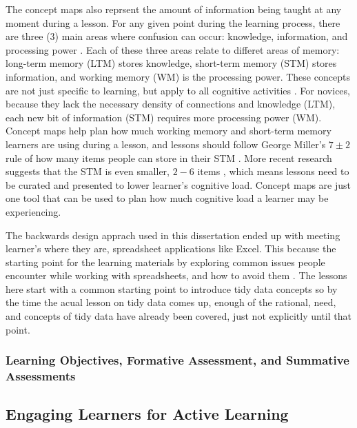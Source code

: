 \documentclass[010-intro.tex]{subfiles}
\begin{document}
        The concept maps also reprsent the amount of information being taught at any moment during a lesson.
        For any given point during the learning process,
        there are three (3) main areas where confusion can occur:
        knowledge, information, and processing power \cite{hermansProgrammerBrain2021}.
        Each of these three areas relate to differet areas of memory:
        long-term memory (LTM) stores knowledge,
        short-term memory (STM) stores information, and
        working memory (WM) is the processing power.
        These concepts are not just specific to learning, but apply to all cognitive activities
        \cite{hermansProgrammerBrain2021}.
        For novices, because they lack the necessary density of connections and knowledge (LTM),
        each new bit of information (STM) requires more processing power (WM).
        Concept maps help plan how much working memory and short-term memory learners are using during a lesson,
        and lessons should follow George Miller's $7\pm2$ rule of how many items people can store in their STM
        \cite{miller1956magical}.
        More recent research suggests that the STM is even smaller, $2-6$ items
        \cite{hermansProgrammerBrain2021},
        which means lessons need to be curated and presented to lower learner's cognitive load.
        Concept maps are just one tool that can be used to plan how much cognitive load a learner may be experiencing.

        The backwards design apprach used in this dissertation ended up with meeting learner's where they are,
        spreadsheet applications like Excel.
        This because the starting point for the learning materials by exploring common issues people encounter while
        working with spreadsheets, and how to avoid them
        \cite{bromanDataOrganizationSpreadsheets2018}.
        The lessons here start with a common starting point to introduce tidy data concepts so by
        the time the acual lesson on tidy data comes up,
        enough of the rational, need, and concepts of tidy data have already been covered,
        just not explicitly until that point.


        \subsubsection{Learning Objectives, Formative Assessment, and Summative Assessments}



    \subsection{Engaging Learners for Active Learning}
\end{document}
